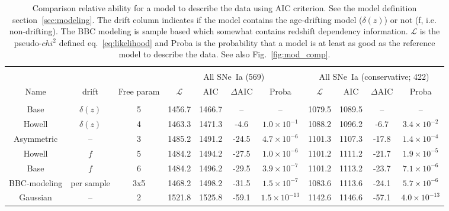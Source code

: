 \documentclass[]{aa} %
\begin{document}
\begin{table}
    \centering
    \caption{Comparison relative ability for a model to describe the data using
    AIC criterion. See the model definition section~\ref{sec:modeling}. The
drift column indicates if the model contains the age-drifting model
($\delta(z)$) or not (f, i.e. non-drifting). The BBC modeling is sample based
which somewhat contains redshift dependency information. $\mathcal{L}$ is the
pseudo-$chi^{2}$ defined eq.~\ref{eq:likelihood} and Proba is the probability
that a model is at least as good as the reference model to describe the data.
See also Fig.~\ref{fig:mod_comp}.}
    \label{tab:comp}
    \begin{tabular}{c c c  |c c c c|  c c c c}\hline\hline\\[-0.8em]
        & & & \multicolumn{4}{|c}{All SNe~Ia (569)} & \multicolumn{4}{|c}{All SNe~Ia (conservative; 422)} \\
        Name & drift & Free param &
        $\mathcal{L}$ & $\mathrm{AIC}$ & $\Delta \mathrm{AIC}$ & Proba & $\mathcal{L}$ & $\mathrm{AIC}$ & $\Delta \mathrm{AIC}$ & Proba \\[0.15em]
        \hline\\[-0.8em]

        Base & $\delta(z)$ & 5
        & 1456.7 & 1466.7 & -- & --
        & 1079.5 & 1089.5 & -- & --\\[0.15em]

        Howell & $\delta(z)$ & 4
        & 1463.3 & 1471.3 & -4.6 & $1.0\times10^{-1}$
        & 1088.2 & 1096.2 & -6.7 & $3.4\times10^{-2}$\\[0.15em]

        Asymmetric & -- & 3
        & 1485.2 & 1491.2 & -24.5 & $4.7\times10^{-6}$
        & 1101.3 & 1107.3 & -17.8 & $1.4\times10^{-4}$\\[0.15em]

        Howell & $f$ & 5
        & 1484.2 & 1494.2 & -27.5 & $1.0\times10^{-6}$
        & 1101.2 & 1111.2 & -21.7 & $1.9\times10^{-5}$\\[0.15em]

        Base & $f$ & 6
        & 1484.2 & 1496.2 & -29.5 & $3.9\times10^{-7}$
        & 1101.2 & 1113.2 & -23.7 & $7.1\times10^{-6}$\\[0.15em]

        BBC-modeling & per sample & 3x5
        & 1468.2 & 1498.2 & -31.5 & $1.5\times10^{-7}$
        & 1083.6 & 1113.6 & -24.1 & $5.7\times10^{-6}$\\[0.15em]

        Gaussian & -- & 2
        & 1521.8 & 1525.8 & -59.1 & $1.5\times10^{-13}$
        & 1142.6 & 1146.6 & -57.1 & $4.0\times10^{-13}$ \\\hline\hline
    \end{tabular}
\end{table}
\end{document}

